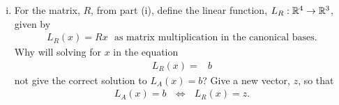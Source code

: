 \begin{question}
\begin{enumerate}[(i)]
        \item For the matrix, $R$, from part (i), define the linear function, $L_R:{\mathbb R}^4\to{\mathbb R}^3$, given by
              \begin{align*}
                  L_R(x) = Rx\ \ \ \text{as matrix multiplication in the canonical bases}.
              \end{align*}
              Why will solving for $x$ in the equation
              \begin{align*}
                  L_R(x)=&b
              \end{align*}
              not give the correct solution to $L_A(x)=b$?  Give a new vector, $z$, so that
              \begin{align*}
                  L_A(x)=b\ \ \ \iff\ \ \ L_R(x)=z.
              \end{align*}
    \end{enumerate}
\end{question}

